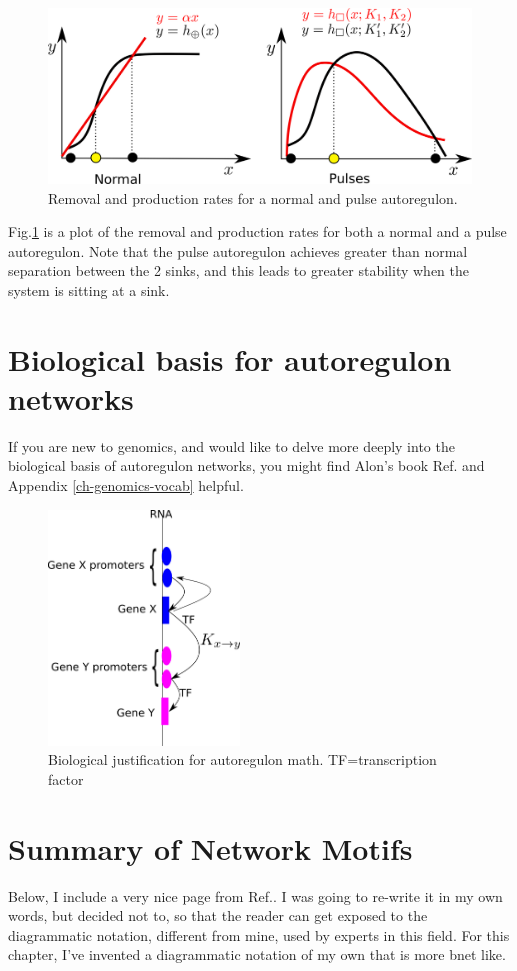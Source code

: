 \begin{figure}[h!]
\centering
\includegraphics[width=4.7in]
{autoregulons/pulse-removal-production.png}
\caption{Removal and production rates for
a normal and pulse autoregulon.}
\label{fig-pulse-removal-production}
\end{figure}
Fig.\ref{fig-pulse-removal-production}
is a plot of the removal and production rates for both
a normal and a pulse autoregulon. Note
that the pulse autoregulon
achieves greater
than normal separation
between the 2 sinks, 
and this leads to greater stability 
when the system is sitting at a sink.



\section{Biological basis for autoregulon networks}

If you are new to genomics, and would like to delve more deeply into the biological
basis of autoregulon networks, you might find
Alon's book Ref.\cite{alon-book} and Appendix \ref{ch-genomics-vocab} helpful.

\begin{figure}[h!]
\centering
\includegraphics[width=2in]
{autoregulons/autoreg-bio.png}
\caption{Biological justification
for autoregulon math.  TF=transcription factor}
\label{fig-autoreg-bio}
\end{figure}

\section{Summary of Network Motifs}
Below, I include a very nice page from Ref.\cite{alon-book}.
I was going to re-write it in my own words, but
decided not to, so that the reader can get exposed to
the diagrammatic  notation, different from mine, used by experts in this field.
For this chapter, I've invented a diagrammatic
notation of my own that is more bnet like.
\newpage

